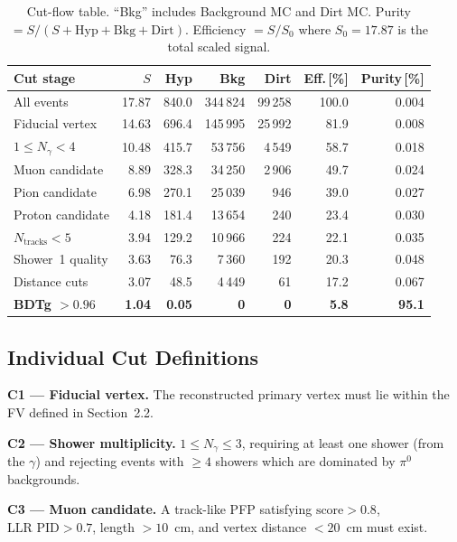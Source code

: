 \documentclass[12pt,a4paper]{article}
\begin{document}
\begin{table}[H]
  \centering
  \caption{Cut-flow table.  ``Bkg'' includes Background MC and Dirt MC.
           Purity $= S/(S+\text{Hyp}+\text{Bkg}+\text{Dirt})$.
           Efficiency $= S/S_0$ where $S_0 = 17.87$ is the total scaled
           signal.}
  \label{tab:cutflow}
  \setlength{\tabcolsep}{6pt}
  \begin{tabular}{lrrrrrr}
    \toprule
    Cut stage & $S$ & Hyp & Bkg & Dirt
              & Eff.\,[\%] & Purity\,[\%] \\
    \midrule
    All events       & 17.87 & 840.0 & 344\,824 & 99\,258 & 100.0 & 0.004 \\
    Fiducial vertex  & 14.63 & 696.4 & 145\,995 & 25\,992 &  81.9 & 0.008 \\
    $1 \le N_\gamma < 4$ & 10.48 & 415.7 &  53\,756 &  4\,549 &  58.7 & 0.018 \\
    Muon candidate   &  8.89 & 328.3 &  34\,250 &  2\,906 &  49.7 & 0.024 \\
    Pion candidate   &  6.98 & 270.1 &  25\,039 &    946 &  39.0 & 0.027 \\
    Proton candidate &  4.18 & 181.4 &  13\,654 &    240 &  23.4 & 0.030 \\
    $N_\text{tracks} < 5$ & 3.94 & 129.2 & 10\,966 & 224 & 22.1 & 0.035 \\
    Shower~1 quality &  3.63 &  76.3 &   7\,360 &    192 &  20.3 & 0.048 \\
    Distance cuts    &  3.07 &  48.5 &   4\,449 &     61 &  17.2 & 0.067 \\
    \midrule
    \textbf{BDTg $> 0.96$} & \textbf{1.04} & \textbf{0.05} & \textbf{0} & \textbf{0} & \textbf{5.8} & \textbf{95.1} \\
    \bottomrule
  \end{tabular}
\end{table}

\subsection{Individual Cut Definitions}

\textbf{C1 — Fiducial vertex.}
The reconstructed primary vertex must lie within the FV defined in
Section~2.2.

\textbf{C2 — Shower multiplicity.}
$1 \le N_\gamma \le 3$, requiring at least one shower (from the $\gamma$)
and rejecting events with $\ge 4$ showers which are dominated by $\pi^0$
backgrounds.

\textbf{C3 — Muon candidate.}
A track-like PFP satisfying $\text{score} > 0.8$, $\text{LLR PID} > 0.7$,
length $> 10$~cm, and vertex distance $< 20$~cm must exist.
\end{document}
